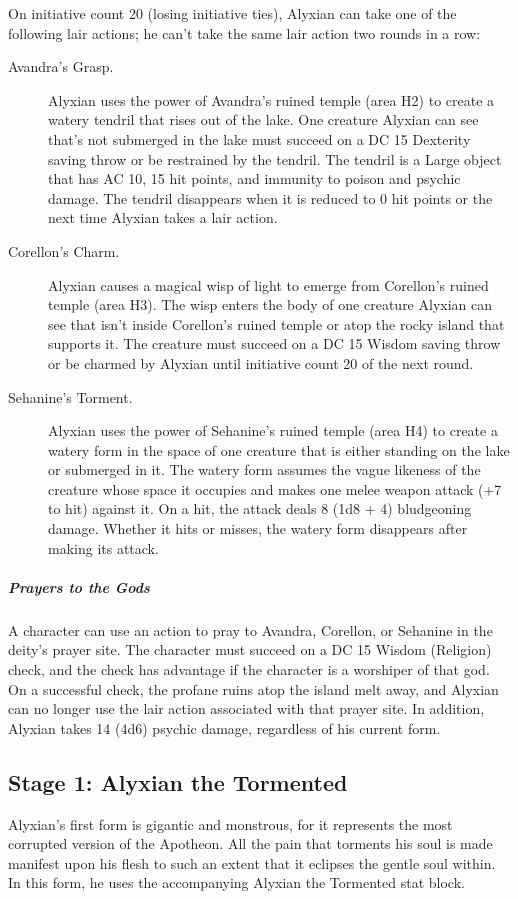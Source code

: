 \documentclass[10pt,a4paper,twoside,fancy,bg=print,twocolumn,openany,nodeprecatedcode]{dndbook}
\begin{document}
On initiative count 20 (losing initiative ties), Alyxian can take one of the following lair actions; he can't take the same lair action two rounds in a row:


\begin{description}
\item[Avandra's Grasp.]
Alyxian uses the power of Avandra's ruined temple (area H2) to create a watery tendril that rises out of the lake. One creature Alyxian can see that's not submerged in the lake must succeed on a DC 15 Dexterity saving throw or be restrained by the tendril. The tendril is a Large object that has AC 10, 15 hit points, and immunity to poison and psychic damage. The tendril disappears when it is reduced to 0 hit points or the next time Alyxian takes a lair action.
\item[Corellon's Charm.]
Alyxian causes a magical wisp of light to emerge from Corellon's ruined temple (area H3). The wisp enters the body of one creature Alyxian can see that isn't inside Corellon's ruined temple or atop the rocky island that supports it. The creature must succeed on a DC 15 Wisdom saving throw or be charmed by Alyxian until initiative count 20 of the next round.
\item[Sehanine's Torment.]
Alyxian uses the power of Sehanine's ruined temple (area H4) to create a watery form in the space of one creature that is either standing on the lake or submerged in it. The watery form assumes the vague likeness of the creature whose space it occupies and makes one melee weapon attack (+7 to hit) against it. On a hit, the attack deals 8 (1d8 + 4) bludgeoning damage. Whether it hits or misses, the watery form disappears after making its attack.
\end{description}

\subparagraph{Prayers to the Gods}
A character can use an action to pray to Avandra, Corellon, or Sehanine in the deity's prayer site. The character must succeed on a DC 15 Wisdom (Religion) check, and the check has advantage if the character is a worshiper of that god. On a successful check, the profane ruins atop the island melt away, and Alyxian can no longer use the lair action associated with that prayer site. In addition, Alyxian takes 14 (4d6) psychic damage, regardless of his current form.

\subsection{Stage 1: Alyxian the Tormented}
Alyxian's first form is gigantic and monstrous, for it represents the most corrupted version of the Apotheon. All the pain that torments his soul is made manifest upon his flesh to such an extent that it eclipses the gentle soul within. In this form, he uses the accompanying Alyxian the Tormented stat block.
\end{document}
